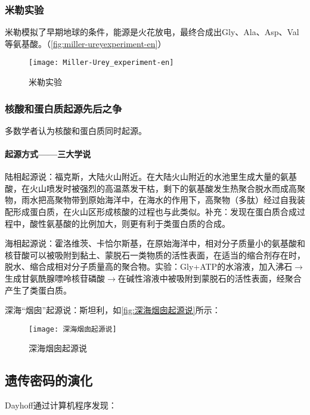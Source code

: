 \subsubsection{米勒实验}

米勒模拟了早期地球的条件，能源是火花放电，最终合成出Gly、Ala、Asp、Val等氨基酸。（\autoref{fig:miller-ureyexperiment-en}）

\begin{figure}[h]
	\centering
	\texttt{[image: Miller-Urey\_experiment-en]}
	\caption{米勒实验}
	\label{fig:miller-ureyexperiment-en}
\end{figure}


\subsubsection{核酸和蛋白质起源先后之争}

多数学者认为核酸和蛋白质同时起源。

\paragraph{起源方式——三大学说}

陆相起源说：福克斯，大陆火山附近。在大陆火山附近的水池里生成大量的氨基酸，在火山喷发时被强烈的高温蒸发干枯，剩下的氨基酸发生热聚合脱水而成高聚物，雨水把高聚物带到原始海洋中，在海水的作用下，高聚物（多肽）经过自我装配形成蛋白质，在火山区形成核酸的过程也与此类似。补充：发现在蛋白质合成过程中，酸性氨基酸的比例加大，则更有利于类蛋白质的合成。

海相起源说：霍洛维茨、卡恰尔斯基，在原始海洋中，相对分子质量小的氨基酸和核苷酸可以被吸附到黏土、蒙脱石一类物质的活性表面，在适当的缩合剂存在时，脱水、缩合成相对分子质量高的聚合物。实验：Gly+ATP的水溶液，加入沸石$\longrightarrow$生成甘氨酰腺嘌呤核苷磷酸$\longrightarrow$在碱性溶液中被吸附到蒙脱石的活性表面，经聚合产生了类蛋白质。

深海“烟囱”起源说：斯坦利，如\autoref{fig:深海烟囱起源说}所示：

\begin{figure}[htb]
	\centering
	\texttt{[image: 深海烟囱起源说]}
	\caption{深海烟囱起源说}
	\label{fig:深海烟囱起源说}
\end{figure}

\subsection{遗传密码的演化}

Dayhoff通过计算机程序发现：

